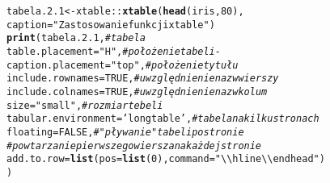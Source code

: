 \documentclass[a4paper, 10pt]{article}\usepackage[]{graphicx}\usepackage[]{color}
\makeatletter
\newcommand{\hlnum}[1]{\textcolor[rgb]{0.686,0.059,0.569}{#1}}%
\newcommand{\hlstr}[1]{\textcolor[rgb]{0.192,0.494,0.8}{#1}}%
\newcommand{\hlcom}[1]{\textcolor[rgb]{0.678,0.584,0.686}{\textit{#1}}}%
\newcommand{\hlopt}[1]{\textcolor[rgb]{0,0,0}{#1}}%
\newcommand{\hlstd}[1]{\textcolor[rgb]{0.345,0.345,0.345}{#1}}%
\newcommand{\hlkwb}[1]{\textcolor[rgb]{0.69,0.353,0.396}{#1}}%
\newcommand{\hlkwc}[1]{\textcolor[rgb]{0.333,0.667,0.333}{#1}}%
\newcommand{\hlkwd}[1]{\textcolor[rgb]{0.737,0.353,0.396}{\textbf{#1}}}%
\newenvironment{kframe}{%
 \def\at@end@of@kframe{}%
 \ifinner\ifhmode%
  \def\at@end@of@kframe{\end{minipage}}%
  \begin{minipage}{\columnwidth}%
 \fi\fi%
 \def\FrameCommand##1{\hskip\@totalleftmargin \hskip-\fboxsep
 \colorbox{shadecolor}{##1}\hskip-\fboxsep
     \hskip-\linewidth \hskip-\@totalleftmargin \hskip\columnwidth}%
 \MakeFramed {\advance\hsize-\width
   \@totalleftmargin\z@ \linewidth\hsize
   \@setminipage}}%
 {\par\unskip\endMakeFramed%
 \at@end@of@kframe}
\makeatother
\begin{document}
\begin{kframe}
\begin{alltt}
\hlstd{tabela.2.1}\hlkwb{<-}\hlstd{xtable}\hlopt{::} \hlkwd{xtable}\hlstd{(}\hlkwd{head}\hlstd{(iris,} \hlnum{80}\hlstd{),}
                            \hlkwc{caption}\hlstd{=}\hlstr{"Zastosowanie funkcji xtable "}\hlstd{)}
\hlkwd{print}\hlstd{( tabela.2.1,} \hlcom{# tabela}
       \hlkwc{table.placement} \hlstd{=} \hlstr{"H"}\hlstd{,} \hlcom{# położenie tabeli - }
       \hlkwc{caption.placement} \hlstd{=} \hlstr{"top"}\hlstd{,} \hlcom{# położenie tytułu}
       \hlkwc{include.rownames} \hlstd{=} \hlnum{TRUE}\hlstd{,} \hlcom{# uwzględnienie nazw wierszy}
       \hlkwc{include.colnames} \hlstd{=} \hlnum{TRUE}\hlstd{,} \hlcom{# uwzględnienie nazw kolum}
       \hlkwc{size} \hlstd{=} \hlstr{"small"}\hlstd{,} \hlcom{# rozmiar tebeli}
       \hlkwc{tabular.environment} \hlstd{=} \hlstr{'longtable'}\hlstd{,} \hlcom{# tabela na kilku stronach}
       \hlkwc{floating} \hlstd{=} \hlnum{FALSE}\hlstd{,} \hlcom{# "pływanie" tabeli po stronie}
       \hlcom{# powtarzanie pierwszego wiersza na każdej stronie}
       \hlkwc{add.to.row} \hlstd{=} \hlkwd{list}\hlstd{(}\hlkwc{pos} \hlstd{=} \hlkwd{list}\hlstd{(}\hlnum{0}\hlstd{),} \hlkwc{command} \hlstd{=} \hlstr{"\textbackslash{}\textbackslash{}hline \textbackslash{}\textbackslash{}endhead "}\hlstd{)}
\hlstd{)}
\end{alltt}
\end{kframe}%
\end{document}
